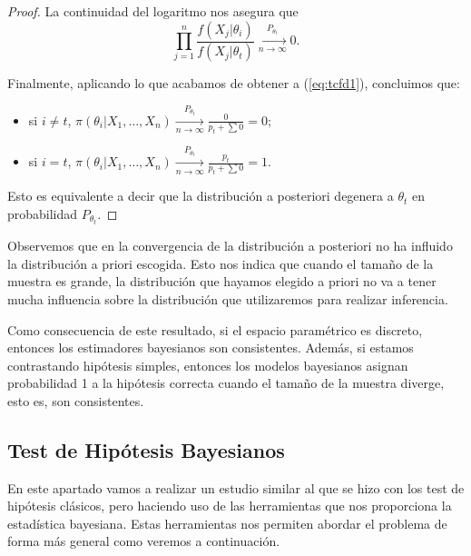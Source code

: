 \begin{proof}
	La continuidad del logaritmo nos asegura que
    \[\prod_{j=1}^n{\frac{f(X_j|\theta_i)}{f(X_j|\theta_t)}} \xrightarrow[n\to\infty]{P_{\theta_t}} 0.\]

	Finalmente, aplicando lo que acabamos de obtener a (\ref{eq:tcfd1}), concluimos que:

	\begin{itemize}
		\item si $i \ne t$, $\pi(\theta_i|X_1,\ldots,X_n) \xrightarrow[n\to\infty]{P_{\theta_t}} \frac{0}{p_t+\sum{0}} = 0$;
		\item si $i = t$, $\pi(\theta_i|X_1,\ldots,X_n) \xrightarrow[n\to\infty]{P_{\theta_t}} \frac{p_t}{p_t+\sum{0}} = 1$.
	\end{itemize}

	Esto es equivalente a decir que la distribución a posteriori degenera a $\theta_t$ en probabilidad $P_{\theta_t}$.
\end{proof}

\begin{remark}
	Observemos que en la convergencia de la distribución a posteriori no ha influido la distribución a priori escogida. Esto nos indica que cuando el tamaño de la muestra es grande, la distribución que hayamos elegido a priori no va a tener mucha influencia sobre la distribución que utilizaremos para realizar inferencia.
\end{remark}

\begin{remark}
    Como consecuencia de este resultado, si el espacio paramétrico es discreto, entonces los estimadores bayesianos son consistentes. Además, si estamos contrastando hipótesis simples, entonces los modelos bayesianos asignan probabilidad 1 a la hipótesis correcta cuando el tamaño de la muestra diverge, esto es, son consistentes.
\end{remark}

\subsection{Test de Hipótesis Bayesianos} \label{sec:bayes:hipotesis}

En este apartado vamos a realizar un estudio similar al que se hizo con los test de hipótesis clásicos, pero haciendo uso de las herramientas que nos proporciona la estadística bayesiana. Estas herramientas nos permiten abordar el problema de forma más general como veremos a continuación. %

